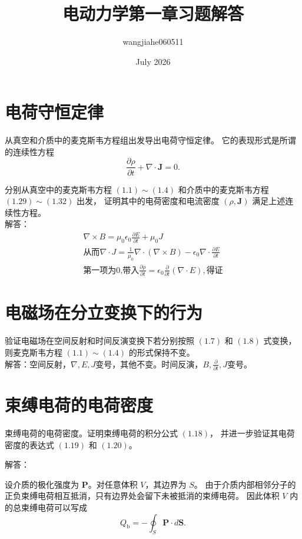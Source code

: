 \documentclass{article}
\title{电动力学第一章习题解答}
\author{wangjiahe060511 }
\date{July 2026}
\begin{document}
\maketitle

\section{ 电荷守恒定律}
从真空和介质中的麦克斯韦方程组出发导出电荷守恒定律。
它的表现形式是所谓的连续性方程\\
\begin{equation}
    \frac{\partial \rho}{\partial t}
    +
    \nabla \cdot \mathbf{J}
    =
    0 .
\end{equation}

分别从真空中的麦克斯韦方程 $(1.1)\sim(1.4)$
和介质中的麦克斯韦方程 $(1.29)\sim(1.32)$ 出发，
证明其中的电荷密度和电流密度 $(\rho,\mathbf{J})$
满足上述连续性方程。\\
解答：\\
\begin{align}
    \nabla \times B=\mu_0 \epsilon_0 \frac{\partial E}{\partial t}+\mu_0 J\\
    \text{从而}\nabla \cdot J=\frac{1}{\mu_0}\nabla \cdot(\nabla \times B)-\epsilon_0 \nabla \cdot \frac{\partial E}{\partial t}\\
    \text{第一项为0,带入}\frac{\partial \rho}{\partial t}=\epsilon_0\frac{\partial}{\partial t}(\nabla \cdot E),\text{得证} 
\end{align}
\section{电磁场在分立变换下的行为}

验证电磁场在空间反射和时间反演变换下若分别按照
$(1.7)$ 和 $(1.8)$ 式变换，
则麦克斯韦方程 $(1.1)\sim(1.4)$ 的形式保持不变。\\
解答：空间反射，$\nabla,E,J$变号，其他不变。时间反演，$B,\frac{\partial}{\partial t},J$变号。
\section{束缚电荷的电荷密度}

束缚电荷的电荷密度。证明束缚电荷的积分公式 $(1.18)$，
并进一步验证其电荷密度的表达式 $(1.19)$ 和 $(1.20)$。

\noindent
解答：

设介质的极化强度为 $\mathbf{P}$。对任意体积 $V$，其边界为 $S$。
由于介质内部相邻分子的正负束缚电荷相互抵消，只有边界处会留下未被抵消的束缚电荷。
因此体积 $V$ 内的总束缚电荷可以写成
\begin{equation}
    Q_{\mathrm{b}}
    =
    -\oint_S \mathbf{P}\cdot d\mathbf{S}.
\end{equation}
\end{document}
